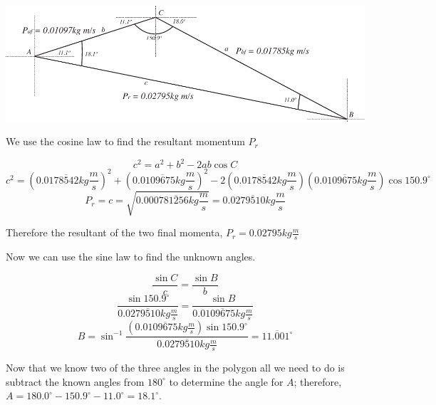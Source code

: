 \documentclass[12pt]{article}
\begin{document}
\begin{enumerate}
{\includegraphics{polygon.pdf}

We use the cosine law to find the resultant momentum $P_{r}$

\begin{equation}
c^2=a^2+b^2-2ab\cos{C}
\end{equation}
\begin{equation}
c^2=(0.0178\overline{5}42kg\frac{m}{s})^2+(0.0109\overline{6}75kg\frac{m}{s})^2-2(0.0178\overline{5}42kg\frac{m}{s})(0.0109\overline{6}75kg\frac{m}{s})\cos{150.9^{\circ}}
\end{equation}
\begin{equation}
P_{r}=c=\sqrt{0.000781\overline{2}56kg\frac{m}{s}}=0.0279\overline{5}10kg\frac{m}{s}
\end{equation}

Therefore the resultant of the two final momenta, $P_{r}=0.02795kg\frac{m}{s}$

Now we can use the sine law to find the unknown angles.

\begin{equation}
\frac{\sin{C}}{c}=\frac{\sin{B}}{b}
\end{equation}
\begin{equation}
\frac{\sin{150.9^{\circ}}}{0.0279\overline{5}10kg\frac{m}{s}}=\frac{\sin{B}}{0.0109\overline{6}75kg\frac{m}{s}}
\end{equation}
\begin{equation}
B=\sin^{-1}\frac{(0.0109\overline{6}75kg\frac{m}{s})\sin{150.9^{\circ}}}{0.0279\overline{5}10kg\frac{m}{s}}=11.\overline{0}01^{\circ}
\end{equation}

Now that we know two of the three angles in the polygon all we need to do is subtract the known angles from $180^{\circ}$ to determine the angle for $A$; therefore, $A=180.0^{\circ}-150.9^{\circ}-11.0^{\circ}=18.1^{\circ}$.}
\pagebreak
\space
\newline


\end{enumerate}
\end{document}

